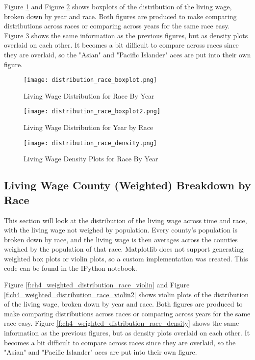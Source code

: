 Figure \ref{f:ch4_distribution_race_boxplot} and Figure \ref{f:ch4_distribution_race_boxplot2} shows boxplots of the distribution of the living wage, broken down by year and race. Both figures are produced to make comparing distributions across races or comparing across years for the same race easy. Figure \ref{f:ch4_distribution_race_density} shows the same information as the previous  figures, but as density plots overlaid on each other. It becomes a bit difficult to compare across races since they are overlaid, so the "Asian" and "Pacific Islander" aces are put into their own figure.

\begin{figure}[H]
    \centering
        \texttt{[image: distribution\_race\_boxplot.png]}
        \caption{Living Wage Distribution for Race By Year}
    \label{f:ch4_distribution_race_boxplot}
\end{figure}

\begin{figure}[H]
    \centering
        \texttt{[image: distribution\_race\_boxplot2.png]}
        \caption{Living Wage Distribution for Year by Race}
    \label{f:ch4_distribution_race_boxplot2}
\end{figure}

\begin{figure}[H]
    \centering
        \texttt{[image: distribution\_race\_density.png]}
        \caption{Living Wage Density Plots for Race By Year}
    \label{f:ch4_distribution_race_density}
\end{figure}




\subsection{Living Wage County (Weighted) Breakdown by Race}

This section will look at the distribution of the living wage across time and race, with the living wage not weighed by population. Every county's population is broken down by race, and the living wage is then averages across the counties weighed by the population of that race. Matplotlib does not support generating weighted box plots or violin plots, so a custom implementation was created. This code can be found in the IPython notebook.

Figure \ref{f:ch4_weighted_distribution_race_violin} and Figure \ref{f:ch4_weighted_distribution_race_violin2} shows violin plots of the distribution of the living wage, broken down by year and race. Both figures are produced to make comparing distributions across races or comparing across years for the same race easy. Figure \ref{f:ch4_weighted_distribution_race_density} shows the same information as the previous  figures, but as density plots overlaid on each other. It becomes a bit difficult to compare across races since they are overlaid, so the "Asian" and "Pacific Islander" aces are put into their own figure.

